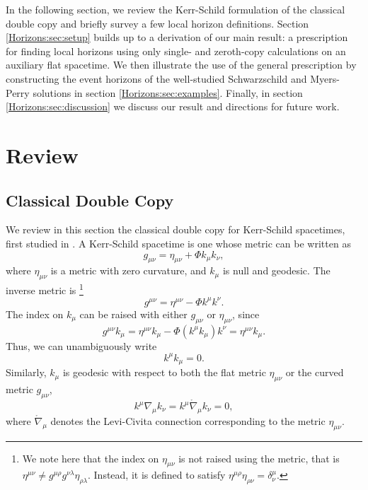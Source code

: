 In the following section, we review the Kerr-Schild formulation of the classical double copy and briefly survey a
few local horizon definitions. Section \ref{Horizons:sec:setup} builds up to a derivation of our main result: a prescription
for finding local horizons using only single- and zeroth-copy calculations on an auxiliary flat spacetime. We then
illustrate the use of the general prescription by constructing the event horizons of the well-studied Schwarzschild
and Myers-Perry solutions in section \ref{Horizons:sec:examples}. Finally, in section \ref{Horizons:sec:discussion} we discuss our
result and directions for future work.

\section{Review} \label{Horizons:sec:review} 

\subsection{Classical Double Copy} \label{Horizons:sec:classicalDoubleCopy}
We review in this section the classical double copy for Kerr-Schild spacetimes, first studied in
\cite{Monteiro:2014cda}. A Kerr-Schild spacetime is one whose metric can be written as
%
\begin{equation} \label{Horizons:kerrSchildMetric} 
    g_{\mu \nu} = \eta_{\mu \nu} + \Phi k_{\mu} k_{\nu},
\end{equation}
%
where $\eta_{\mu \nu}$ is a metric with zero curvature, and $k_{\mu}$ is null and geodesic. The inverse metric is
\footnote{We note here that the index on $\eta_{\mu \nu}$ is not raised using the metric, that is $\eta^{\mu \nu}
\neq g^{\mu \rho} g^{\nu \lambda} \eta_{\rho \lambda}$. Instead, it is defined to satisfy $\eta^{\mu \rho}
\eta_{\rho \nu} = \delta^{\mu}_{\nu}$. }
\begin{equation} \label{Horizons:kerrSchildMetricInverse} 
    g^{\mu \nu} = \eta^{\mu \nu} - \Phi k^{\mu} k^{\nu}.
\end{equation}
The index on $k_{\mu}$ can be raised with
either $g_{\mu \nu}$ or $\eta_{\mu \nu}$, since
\begin{equation} 
    g^{\mu \nu} k_{\mu} = \eta^{\mu \nu} k_{\mu} - \Phi \left(k^{\mu} k_{\mu}\right) k^{\nu} =
    \eta^{\mu \nu} k_{\mu}.
\end{equation}
Thus, we can unambiguously write
\begin{equation} \label{Horizons:kNull} 
    k^{\mu} k_{\mu} = 0.
\end{equation}
Similarly, $k_{\mu}$ is geodesic with respect to both the flat metric $\eta_{\mu \nu}$ or the curved metric $g_{\mu
\nu}$,
\begin{equation} \label{Horizons:kGeodesic} 
    k^{\mu} \nabla_{\mu} k_{\nu} = k^{\mu} \mathring{\nabla}_{\mu} k_{\nu} = 0,
\end{equation}
where $ \mathring{\nabla}_{\mu}$ denotes the Levi-Civita connection corresponding to the metric $\eta_{\mu \nu}$.

